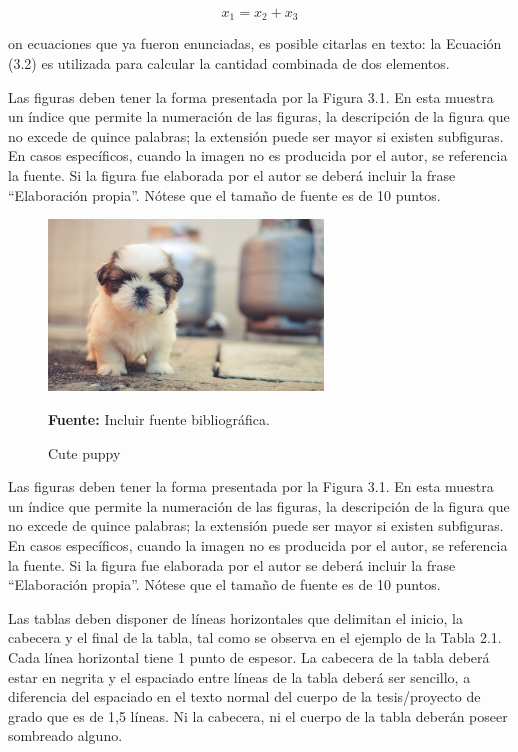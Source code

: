 \begin{equation}
	x_1 = x_2 + x_3
\end{equation}

on ecuaciones que ya fueron enunciadas, es posible citarlas en texto: la Ecuación (3.2) es utilizada para calcular la cantidad combinada de dos elementos.

Las figuras deben tener la forma presentada por la Figura 3.1. En esta muestra un índice que permite la numeración de las figuras, la descripción de la figura que no excede de quince palabras; la extensión puede ser mayor si existen subfiguras. En casos específicos, cuando la imagen no es producida por el autor, se referencia la fuente. Si la figura fue elaborada por el autor se deberá incluir la frase “Elaboración propia”. Nótese que el tamaño de fuente es de 10 puntos.

\begin{figure}
	\centering
	\includegraphics[width=0.65\textwidth]{images/puppy_dog_cute.jpg}
	\caption{Cute puppy} \vspace{-0.2cm}
	\footnotesize{\textbf{Fuente:} Incluir fuente bibliográfica.}
	\label{pics:Puppy} 
\end{figure}


Las figuras deben tener la forma presentada por la Figura 3.1. En esta muestra un índice que permite la numeración de las figuras, la descripción de la figura que no excede de quince palabras; la extensión puede ser mayor si existen subfiguras. En casos específicos, cuando la imagen no es producida por el autor, se referencia la fuente. Si la figura fue elaborada por el autor se deberá incluir la frase “Elaboración propia”. Nótese que el tamaño de fuente es de 10 puntos.

Las tablas deben disponer de líneas horizontales que delimitan el inicio, la cabecera y el final de la tabla, tal como se observa en el ejemplo de la Tabla 2.1. Cada línea horizontal tiene 1 punto de espesor. La cabecera de la tabla deberá estar en negrita y el espaciado entre líneas de la tabla deberá ser sencillo, a diferencia del espaciado en el texto normal del cuerpo de la tesis/proyecto de grado que es de 1,5 líneas. Ni la cabecera, ni el cuerpo de la tabla deberán poseer sombreado alguno.

